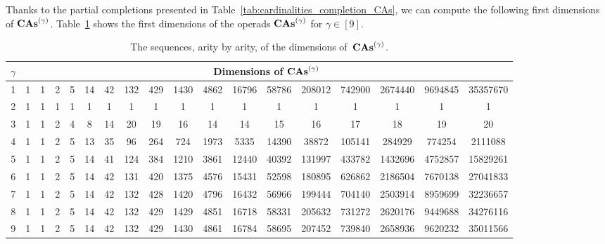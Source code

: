 Thanks to the partial completions presented in
Table~\ref{tab:cardinalities_completion_CAs}, we can compute the
following first dimensions of $\mathbf{CAs}^{\left(\gamma\right)}$.
Table~\ref{tab:dimensions_CAs} shows the first dimensions of the
operads $\mathbf{CAs}^{\left(\gamma\right)}$ for $\gamma \in [9]$.
\begin{table}[ht]
    \centering
    \footnotesize
    \setlength{\tabcolsep}{.35em}
    \begin{tabular}{c||ccccccccccccccccc}
        $\gamma$ & \multicolumn{17}{c}{Dimensions of $\mathbf{CAs}^{\left(\gamma\right)}$}
        \\ \hline \hline
        1 & 1 & 1 & 2 & 5 & 14 & 42 & 132 & 429 & 1430 & 4862
        & 16796 & 58786 & 208012 & 742900 & 2674440 & 9694845
        & 35357670
        \\
        2 & 1 & 1 & 1 & 1 & 1 & 1 & 1 & 1 & 1 & 1 & 1 & 1 & 1 & 1 & 1
        & 1 & 1
        \\
        3 & 1 & 1 & 2 & 4 & 8 & 14 & 20 & 19 & 16 & 14 &
        14 & 15 & 16 & 17 & 18 & 19 & 20
        \\
        4 & 1 & 1 & 2 & 5 & 13 & 35 & 96 & 264 & 724 & 1973 & 5335
        & 14390 & 38872 & 105141 & 284929 & 774254 & 2111088
        \\
        5 & 1 & 1 & 2 & 5 & 14 & 41 & 124 & 384 & 1210 & 3861 & 12440
        & 40392 & 131997 & 433782 & 1432696 & 4752857
        & 15829261
        \\
        6 & 1 & 1 & 2 & 5 & 14 & 42 & 131 & 420 & 1375 & 4576 & 15431
        & 52598 & 180895 & 626862 & 2186504 & 7670138
        & 27041833
        \\
        7 & 1 & 1 & 2 & 5 & 14 & 42 & 132 & 428 & 1420 & 4796 & 16432
        & 56966 & 199444 & 704140 & 2503914 & 8959699
        & 32236657
        \\
        8 & 1 & 1 & 2 & 5 & 14 & 42 & 132 & 429 & 1429 & 4851 & 16718
        & 58331 & 205632 & 731272 & 2620176 & 9449688 & 34276116
        \\
        9 & 1 & 1 & 2 & 5 & 14 & 42 & 132 & 429 & 1430 & 4861 & 16784
        & 58695 & 207452 & 739840 & 2658936 & 9620232 & 35011566
    \end{tabular}
    \medbreak

    \caption{\footnotesize
    The sequences, arity by arity, of the dimensions of~$\mathbf{CAs}^{\left(\gamma\right)}$.}
    \label{tab:dimensions_CAs}
\end{table}
\medbreak

